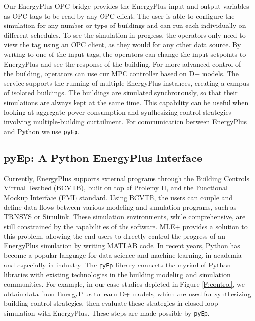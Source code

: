 Our EnergyPlus-OPC bridge provides the EnergyPlus input and output variables as OPC tags to be read by any OPC client.
The user is able to configure the simulation for any number or type of buildings and can run each individually on different schedules.
To see the simulation in progress, the operators only need to view the tag using an OPC client, as they would for any other data source.
By writing to one of the input tags, the operators can change the input setpoints to EnergyPlus and see the response of the building.
For more advanced control of the building, operators can use our MPC controller based on D+ models.
The service supports the running of multiple EnergyPlus instances, creating a campus of isolated buildings.
The buildings are simulated synchronously, so that their simulations are always kept at the same time. %
This capability can be useful when looking at aggregate power consumption and synthesizing control strategies involving multiple-building curtailment.
For communication between EnergyPlus and Python we use \texttt{pyEp}.

\subsection{pyEp: A Python EnergyPlus Interface}

Currently, EnergyPlus supports external programs through the Building Controls Virtual Testbed (BCVTB), built on top of Ptolemy II, and the Functional Mockup Interface (FMI) standard. 
Using BCVTB, the users can couple and define data flows between various modeling and simulation programs, such as TRNSYS or Simulink. 
These simulation environments, while comprehensive, are still constrained by the capabilities of the software. 
MLE+ provides a solution to this problem, allowing the end-users to directly control the progress of an EnergyPlus simulation by writing MATLAB code. 
In recent years, Python has become a popular language for data science and machine learning, in academia and especially in industry. %
The \texttt{pyEp} library connects the myriad of Python libraries with existing technologies in the building modeling and simulation communities.
For example, in our case studies depicted in Figure \ref{F:control}, we obtain data from EnergyPlus to learn D+ models, which are used for synthesizing building control strategies, then evaluate these strategies in closed-loop simulation with EnergyPlus.
These steps are made possible by \texttt{pyEp}.

